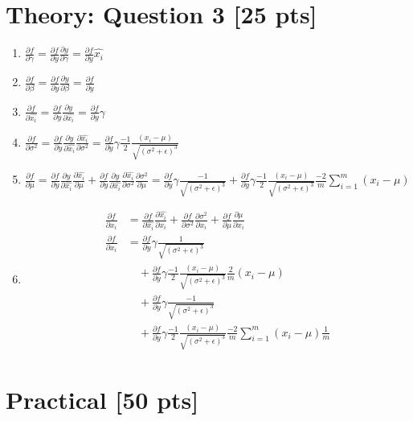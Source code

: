 \documentclass{article}
\begin{document}
\section{Theory: Question 3 [25 pts]}

\begin{enumerate}[label=\alph*.]
    \item $\frac{\partial f}{\partial \gamma} = \frac{\partial f}{\partial y} \frac{\partial y}{\partial \gamma} = \frac{\partial f}{\partial y} \widehat{x_i}$
    \item $\frac{\partial f}{\partial \beta} = \frac{\partial f}{\partial y} \frac{\partial y}{\partial \beta} = \frac{\partial f}{\partial y}$
    \item $\frac{\partial f}{\partial \widehat{x_i}} = \frac{\partial f}{\partial y} \frac{\partial y}{\partial \widehat{x_i}} = \frac{\partial f}{\partial y} \gamma$
    \item $\frac{\partial f}{\partial \sigma^2} = \frac{\partial f}{\partial y} \frac{\partial y}{\partial \widehat{x_i}} \frac{\partial \widehat{x_i}}{\partial \sigma^2} =  \frac{\partial f}{\partial y} \gamma \frac{-1}{2} \frac{(x_i-\mu)}{\sqrt{(\sigma^2 + \epsilon)^3}}$
    \item $\frac{\partial f}{\partial \mu} = \frac{\partial f}{\partial y} \frac{\partial y}{\partial \widehat{x_i}} \frac{\partial \widehat{x_i}}{\partial \mu} + \frac{\partial f}{\partial y} \frac{\partial y}{\partial \widehat{x_i}} \frac{\partial \widehat{x_i}}{\partial \sigma^2} \frac{\partial \sigma^2}{\partial \mu} = \frac{\partial f}{\partial y} \gamma \frac{-1}{\sqrt{(\sigma^2+\epsilon)^3}}+\frac{\partial f}{\partial y} \gamma \frac{-1}{2} \frac{(x_i-\mu)}{\sqrt{(\sigma^2 + \epsilon)^3}} \frac{-2}{m} \sum_{i=1}^{m}(x_i - \mu)$
    \item
    \begin{equation*}
        \begin{aligned}
            \frac{\partial f}{\partial x_i} &= \frac{\partial f}{\partial \widehat{x_i}} \frac{\partial \widehat{x_i}}{\partial x_i} + \frac{\partial f}{\partial \sigma^2} \frac{\partial \sigma^2}{\partial x_i} + \frac{\partial f}{\partial \mu} \frac{\partial \mu}{\partial x_i} \\
            \frac{\partial f}{\partial x_i} &= \frac{\partial f}{\partial y} \gamma \frac{1}{\sqrt{(\sigma^2+\epsilon)^3}} \\
            &\quad+ \frac{\partial f}{\partial y} \gamma \frac{-1}{2} \frac{(x_i-\mu)}{\sqrt{(\sigma^2 + \epsilon)^3}} \frac{2}{m}(x_i-\mu) \\
            &\quad+ \frac{\partial f}{\partial y} \gamma \frac{-1}{\sqrt{(\sigma^2+\epsilon)^3}} \\
            &\quad+ \frac{\partial f}{\partial y} \gamma \frac{-1}{2} \frac{(x_i-\mu)}{\sqrt{(\sigma^2 + \epsilon)^3}} \frac{-2}{m} \sum_{i=1}^{m}(x_i - \mu) \frac{1}{m}
        \end{aligned}
    \end{equation*}
\end{enumerate}

\section{Practical [50 pts]}
\end{document}
